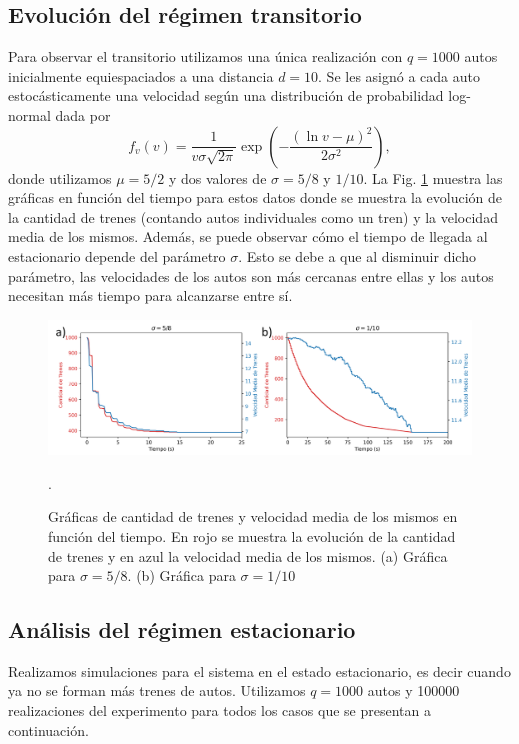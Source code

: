 \documentclass[letterpaper,12pt]{article}
\theoremstyle{plain}
\begin{document}
\subsection{Evolución del régimen transitorio}

Para observar el transitorio utilizamos una única realización con $q=1000$ autos inicialmente equiespaciados a una distancia $d=10$. Se les asignó a cada auto estocásticamente una velocidad según una distribución de probabilidad log-normal dada por
\begin{equation}
f_v (v)= \frac{1}{v\sigma \sqrt{2\pi}} \exp\left(-\frac{(\ln v - \mu)^2}{2\sigma^2}\right),
\end{equation}
donde utilizamos $\mu=5/2$ y dos valores de $\sigma= 5/8$ y $1/10$. La Fig. \ref{fig:trans} muestra las gráficas en función del tiempo para estos datos donde se muestra la evolución de la cantidad de trenes (contando autos individuales como un tren) y la velocidad media de los mismos. Además, se puede observar cómo el tiempo de llegada al estacionario depende del parámetro $\sigma$. Esto se debe a que al disminuir dicho parámetro, las velocidades de los autos son más cercanas entre ellas y los autos necesitan más tiempo para alcanzarse entre sí.

\begin{figure}[h]
    \centering
    \includegraphics[width=\textwidth]{Transssss.png}
    \caption{Gráficas de cantidad de trenes y velocidad media de los mismos en función del tiempo. En rojo se muestra la evolución de la cantidad de trenes y en azul la velocidad media de los mismos. (a) Gráfica para $\sigma= 5/8$. (b) Gráfica para $\sigma= 1/10$}. 
    \label{fig:trans}
\end{figure}

\newpage

\subsection{Análisis del régimen estacionario \label{sec:estacionario}}

Realizamos simulaciones para el sistema en el estado estacionario, es decir cuando ya no se forman más trenes de autos. Utilizamos $q=1000$ autos y 100000 realizaciones del experimento para todos los casos que se presentan a continuación. 
\end{document}
